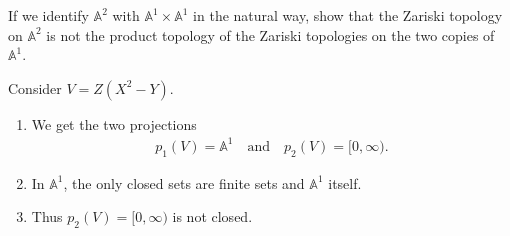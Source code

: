 \begin{exercise}
    If we identify \(\mathbb{A}^2\) with \(\mathbb{A}^1 \times \mathbb{A}^1\) in the natural way, show that the Zariski topology on \(\mathbb{A}^2\) is not the product topology of the Zariski topologies on the two copies of \(\mathbb{A}^1\).
\end{exercise}
\begin{solution}
    Consider \(V = Z(X^2 - Y)\).
    \begin{enumerate}
        \item We get the two projections
        \begin{align*}
            p_1(V) = \mathbb{A}^1 \quad \text{and} \quad p_2(V) = [0, \infty) \text{.}
        \end{align*}
        \item In \(\mathbb{A}^1\), the only closed sets are finite sets and \(\mathbb{A}^1\) itself.
        \item Thus \(p_2(V) = [0, \infty)\) is not closed.
    \end{enumerate}
\end{solution}